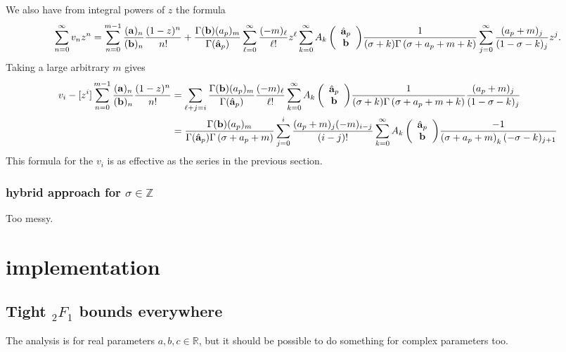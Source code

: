 \documentclass[10pt]{article}
\numberwithin{equation}{section}
\begin{document}
We also have from integral powers of $z$ the formula 
\begin{align*}
\sum_{n=0}^\infty v_nz^n=\sum_{n=0}^{m-1}{\frac{(\bold{a})_n}{(\bold{b})_n} \frac{(1-z)^n}{n!}}+\frac{\Gamma(\bold{b})(a_p)_m}{\Gamma(\hat{\bold{a}}_p)} \sum_{\ell=0}^\infty\frac{(-m)_\ell}{\ell!}z^\ell \sum_{k=0}^{\infty} {A_k\left(\begin{array}{c} \hat{\bold{a}}_p \\ \bold{b} \end{array}\right)} \frac{1}{(\sigma+k) \Gamma
	\left(\sigma+a_p+m+k\right)} \sum_{j=0}^{\infty} \frac{(a_p+m)_j}{(1-\sigma-k)_j} z^j.
\end{align*}
Taking a large arbitrary $m$ gives
\begin{align*}
v_i - [z^i] \sum_{n=0}^{m-1}{\frac{(\bold{a})_n}{(\bold{b})_n} \frac{(1-z)^n}{n!}} &= \sum_{\ell +j=i}\frac{\Gamma(\bold{b})(a_p)_m}{\Gamma(\hat{\bold{a}}_p)}\frac{(-m)_\ell}{\ell!}\sum_{k=0}^{\infty} {A_k\left(\begin{array}{c} \hat{\bold{a}}_p \\ \bold{b} \end{array}\right)} \frac{1}{(\sigma+k) \Gamma
	\left(\sigma+a_p+m+k\right)}\frac{(a_p+m)_j}{(1-\sigma-k)_j}\\
&= \frac{\Gamma(\bold{b}) (a_p)_m}{\Gamma(\hat{\bold{a}}_p) \Gamma\left(\sigma+a_p+m\right)} \sum_{j=0}^{i}\frac{(a_p+m)_j (-m)_{i-j}}{(i-j)!}\sum_{k=0}^{\infty} {A_k\left(\begin{array}{c} \hat{\bold{a}}_p \\ \bold{b} \end{array}\right)} \frac{-1}{\left(\sigma+a_p+m\right)_k (-\sigma-k)_{j+1}}
\end{align*}
This formula for the $v_i$ is as effective as the series in the previous section.

\subsubsection{hybrid approach for $\sigma \in \mathbb{Z}$}
Too messy.




\section{implementation}

\subsection{Tight ${}_2 F_1$ bounds everywhere}
The analysis is for real parameters $a,b,c \in \mathbb{R}$, but it should be possible to do something for complex parameters too.
\end{document}
